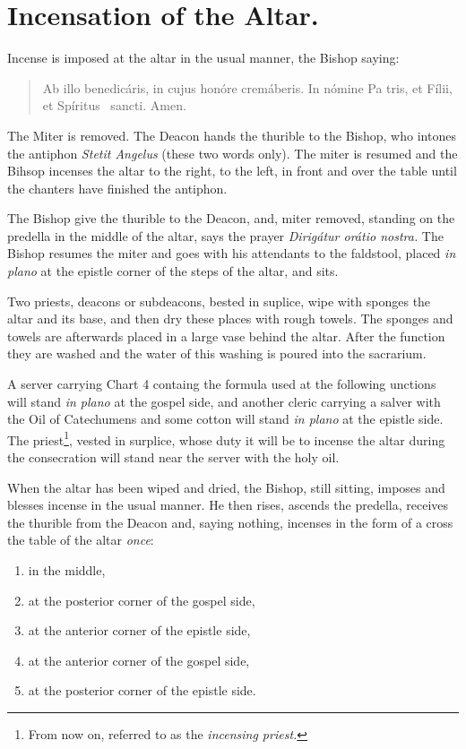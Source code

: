 \documentclass[letterpaper]{report}
\begin{document}
{\section{Incensation of the Altar.}

\rubric Incense is imposed at the altar in the usual manner, the Bishop saying:

\begin{quote}
   Ab illo benedicáris, in cujus honóre cremáberis. In nómine Pa\cross
    tris, et Fí\cross lii, et Spíritus \cross\ sancti. \rbar Amen.
\end{quote}

The Miter is removed. The Deacon hands the thurible to the Bishop, who intones
the antiphon \textit{Stetit Angelus} (these two words only). The miter is
resumed and the Bihsop incenses the altar to the right, to the left, in front
and over the table until the chanters have finished the antiphon.

\rubric The Bishop give the thurible to the Deacon, and, miter removed,
standing on the predella in the middle of the altar, says the prayer
\textit{Dirigátur orátio nostra.} The Bishop resumes the miter and goes with
his attendants to the faldstool, placed \textit{in plano} at the epistle corner
of the steps of the altar, and sits.

\rubric Two priests, deacons or subdeacons, bested in suplice, wipe with
sponges the altar and its base, and then dry these places with rough towels.
The sponges and towels are afterwards placed in a large vase behind the altar.
After the function they are washed and the water of this washing is poured into
the sacrarium.

A server carrying Chart 4 containg the formula used at the following unctions
will stand \textit{in plano} at the gospel side, and another cleric carrying a
salver with the Oil of Catechumens and some cotton will stand \textit{in plano}
at the epistle side. The priest\footnote{From now on, referred to as the
\textit{incensing priest.}}, vested in surplice, whose duty it will be to
incense the altar during the consecration will stand near the server with the
holy oil.

\rubric When the altar has been wiped and dried, the Bishop, still sitting,
imposes and blesses incense in the usual manner. He then rises, ascends the
predella, receives the thurible from the Deacon and, saying nothing, incenses
in the form of a cross the table of the altar \textit{once}: 

\begin{enumerate}
    \item in the middle,
    \item at the posterior corner of the gospel side,
    \item at the anterior corner of the epistle side,
    \item at the anterior corner of the gospel side,
    \item at the posterior corner of the epistle side.
\end{enumerate}

}
\end{document}
